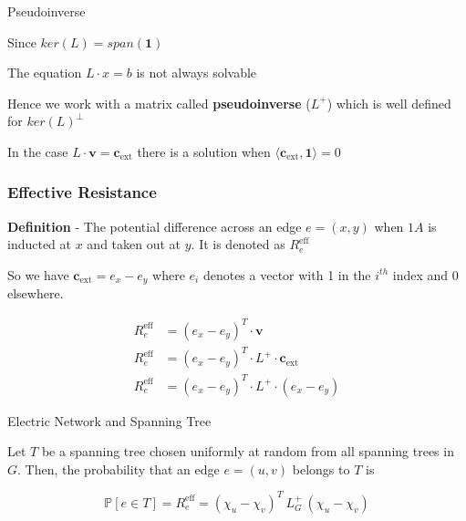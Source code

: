 \documentclass{beamer}
\newcommand{\reff}[1][e]{\ensuremath{R_#1^{\text{eff}}}}
\newcommand{\laplacian}[1][G]{\ensuremath{L_{#1}^{+}}}
\newcommand{\reffformula}[1][\laplacian]{\ensuremath{ (\chi_u - \chi_v)^T \  #1 \ (\chi_u - \chi_v) }}
\begin{document}
\begin{frame}{Pseudoinverse}

Since $ker(L) = span(\textbf{1})$


\leavevmode\hphantom{ }
\leavevmode\hphantom{ }


The equation $L \cdot x = b$ is not always solvable 

\leavevmode\hphantom{ }
\leavevmode\hphantom{ }

Hence we work with a matrix called \textbf{pseudoinverse} ($L^+$) which is well defined for $ker(L)^{\perp}$

\leavevmode\hphantom{ }
\leavevmode\hphantom{ }

In the case $L \cdot \textbf{v} = \textbf{c}_{\text{ext}}$ there is a solution when $\langle \textbf{c}_{\text{ext}} , \textbf{1} \rangle = 0$

\leavevmode\hphantom{ }
\leavevmode\hphantom{ }
 
\end{frame}


\begin{frame}
 \frametitle{Effective Resistance}
 \textbf{Definition} - The potential difference across an edge $e = (x,y)$ when $1A$ is inducted at $x$ and taken out at $y$. It is denoted as \reff


\leavevmode\hphantom{ }
\leavevmode\hphantom{ }

\pause
So we have $\textbf{c}_{\text{ext}} = e_x - e_y$ where $e_i$ denotes a vector with 1 in the $i^{th}$ index and 0 elsewhere. 


\leavevmode\hphantom{ }

\pause
\begin{align*}
 \reff &= (e_x - e_y)^T \cdot \textbf{v} \\
 \reff &= (e_x - e_y)^T \cdot L^+  \cdot \textbf{c}_{\text{ext}} \\
 \reff &= (e_x - e_y)^T \cdot L^+  \cdot (e_x - e_y) 
\end{align*}

\end{frame}

\begin{frame}{Electric Network and Spanning Tree}
 
 \begin{theorem}

 Let $T$ be a spanning tree chosen uniformly at random from all spanning trees in $G$. Then, the probability that an edge $e = (u,v)$ belongs to $T$ is 
 
 $$ \mathbb{P}[e \in T] = \reff = \reffformula $$
 
 \end{theorem}

 
\end{frame}
\end{document}
